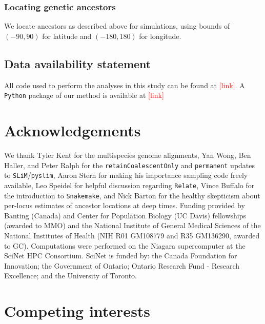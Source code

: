 \documentclass[12pt]{article}
\newcommand{\mo}[1]{\textcolor{red}{[#1]}} %
\begin{document}
\subsubsection*{Locating genetic ancestors}

We locate ancestors as described above for simulations, using bounds of $(-90,90)$ for latitude and  $(-180,180)$ for longitude.

\subsection*{Data availability statement}

All code used to perform the analyses in this study can be found at \mo{link}.
A \texttt{Python} package of our method is available at \mo{link}

\section*{Acknowledgements}

We thank Tyler Kent for the multispecies genome alignments,
Yan Wong, Ben Haller, and Peter Ralph for the \texttt{retainCoalescentOnly} and \texttt{permanent} updates to \texttt{SLiM}/\texttt{pyslim}, 
Aaron Stern for making his importance sampling code freely available, 
Leo Speidel for helpful discussion regarding \texttt{Relate}, 
Vince Buffalo for the introduction to \texttt{Snakemake},
and Nick Barton for the healthy skepticism about per-locus estimates of ancestor locations at deep times.
%
Funding provided by Banting (Canada) and Center for Population Biology (UC Davis) fellowships (awarded to MMO) and the National Institute of General Medical Sciences of the National Institutes of Health (NIH R01 GM108779 and R35 GM136290, awarded to GC).
Computations were performed on the Niagara supercomputer at the SciNet HPC Consortium. SciNet is funded by: the Canada Foundation for Innovation; the Government of Ontario; Ontario Research Fund - Research Excellence; and the University of Toronto.

\section*{Competing interests}
\end{document}
